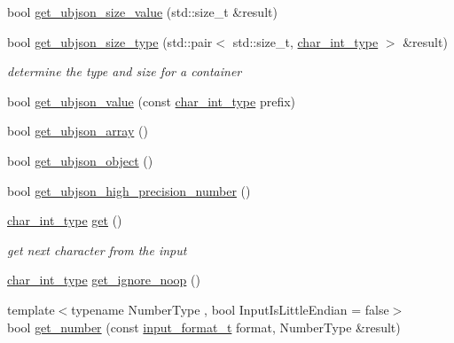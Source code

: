 \begin{DoxyCompactItemize}
bool \hyperlink{classnlohmann_1_1detail_1_1binary__reader_aba7ba9ec9a52ad2bee8baff70176aa20}{get\+\_\+ubjson\+\_\+size\+\_\+value} (std\+::size\+\_\+t \&result)
\item 
bool \hyperlink{classnlohmann_1_1detail_1_1binary__reader_a7b6c2d4c95d56751e233e285a5f1fea7}{get\+\_\+ubjson\+\_\+size\+\_\+type} (std\+::pair$<$ std\+::size\+\_\+t, \hyperlink{classnlohmann_1_1detail_1_1binary__reader_aa12ade9a8c0acaebef6399e3d446b970}{char\+\_\+int\+\_\+type} $>$ \&result)
\begin{DoxyCompactList}\small\item\em determine the type and size for a container \end{DoxyCompactList}\item 
bool \hyperlink{classnlohmann_1_1detail_1_1binary__reader_a7e5e0b71548d0649ce4f131280d06c33}{get\+\_\+ubjson\+\_\+value} (const \hyperlink{classnlohmann_1_1detail_1_1binary__reader_aa12ade9a8c0acaebef6399e3d446b970}{char\+\_\+int\+\_\+type} prefix)
\item 
bool \hyperlink{classnlohmann_1_1detail_1_1binary__reader_afb36cb588b795efa513fc95e949493b7}{get\+\_\+ubjson\+\_\+array} ()
\item 
bool \hyperlink{classnlohmann_1_1detail_1_1binary__reader_adcf64ad3207f4bf37a5a31c920a385c3}{get\+\_\+ubjson\+\_\+object} ()
\item 
bool \hyperlink{classnlohmann_1_1detail_1_1binary__reader_a26c694413fb860057e1a839d5422b361}{get\+\_\+ubjson\+\_\+high\+\_\+precision\+\_\+number} ()
\item 
\hyperlink{classnlohmann_1_1detail_1_1binary__reader_aa12ade9a8c0acaebef6399e3d446b970}{char\+\_\+int\+\_\+type} \hyperlink{classnlohmann_1_1detail_1_1binary__reader_ad222095c0b21a87824cb10629299629a}{get} ()
\begin{DoxyCompactList}\small\item\em get next character from the input \end{DoxyCompactList}\item 
\hyperlink{classnlohmann_1_1detail_1_1binary__reader_aa12ade9a8c0acaebef6399e3d446b970}{char\+\_\+int\+\_\+type} \hyperlink{classnlohmann_1_1detail_1_1binary__reader_a252c1179651d22c5343bcf0b538ed26a}{get\+\_\+ignore\+\_\+noop} ()
\item 
{\footnotesize template$<$typename Number\+Type , bool Input\+Is\+Little\+Endian = false$>$ }\\bool \hyperlink{classnlohmann_1_1detail_1_1binary__reader_ac356c6364fe0273d3303fb7a447f4ef6}{get\+\_\+number} (const \hyperlink{namespacenlohmann_1_1detail_aa554fc6a11519e4f347deb25a9f0db40}{input\+\_\+format\+\_\+t} format, Number\+Type \&result)

\end{DoxyCompactItemize}
